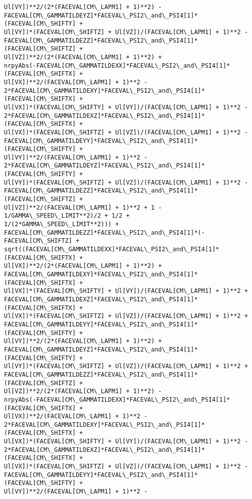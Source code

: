 \documentclass[landscape,letterpaper,10pt,english]{article}
\begin{document}
\begin{Verbatim}[commandchars=\\\{\}]
Ul[VY])**2/(2*(FACEVAL[CM\_LAPM1] + 1)**2) -
FACEVAL[CM\_GAMMATILDEYZ]*FACEVAL\_PSI2\_and\_PSI4[1]*(FACEVAL[CM\_SHIFTY] +
Ul[VY])*(FACEVAL[CM\_SHIFTZ] + Ul[VZ])/(FACEVAL[CM\_LAPM1] + 1)**2 -
FACEVAL[CM\_GAMMATILDEZZ]*FACEVAL\_PSI2\_and\_PSI4[1]*(FACEVAL[CM\_SHIFTZ] +
Ul[VZ])**2/(2*(FACEVAL[CM\_LAPM1] + 1)**2) +
nrpyAbs(-FACEVAL[CM\_GAMMATILDEXX]*FACEVAL\_PSI2\_and\_PSI4[1]*(FACEVAL[CM\_SHIFTX] +
Ul[VX])**2/(FACEVAL[CM\_LAPM1] + 1)**2 -
2*FACEVAL[CM\_GAMMATILDEXY]*FACEVAL\_PSI2\_and\_PSI4[1]*(FACEVAL[CM\_SHIFTX] +
Ul[VX])*(FACEVAL[CM\_SHIFTY] + Ul[VY])/(FACEVAL[CM\_LAPM1] + 1)**2 -
2*FACEVAL[CM\_GAMMATILDEXZ]*FACEVAL\_PSI2\_and\_PSI4[1]*(FACEVAL[CM\_SHIFTX] +
Ul[VX])*(FACEVAL[CM\_SHIFTZ] + Ul[VZ])/(FACEVAL[CM\_LAPM1] + 1)**2 -
FACEVAL[CM\_GAMMATILDEYY]*FACEVAL\_PSI2\_and\_PSI4[1]*(FACEVAL[CM\_SHIFTY] +
Ul[VY])**2/(FACEVAL[CM\_LAPM1] + 1)**2 -
2*FACEVAL[CM\_GAMMATILDEYZ]*FACEVAL\_PSI2\_and\_PSI4[1]*(FACEVAL[CM\_SHIFTY] +
Ul[VY])*(FACEVAL[CM\_SHIFTZ] + Ul[VZ])/(FACEVAL[CM\_LAPM1] + 1)**2 -
FACEVAL[CM\_GAMMATILDEZZ]*FACEVAL\_PSI2\_and\_PSI4[1]*(FACEVAL[CM\_SHIFTZ] +
Ul[VZ])**2/(FACEVAL[CM\_LAPM1] + 1)**2 + 1 - 1/GAMMA\_SPEED\_LIMIT**2)/2 + 1/2 +
1/(2*GAMMA\_SPEED\_LIMIT**2))) +
FACEVAL[CM\_GAMMATILDEZZ]*FACEVAL\_PSI2\_and\_PSI4[1]*(-FACEVAL[CM\_SHIFTZ] +
sqrt((FACEVAL[CM\_GAMMATILDEXX]*FACEVAL\_PSI2\_and\_PSI4[1]*(FACEVAL[CM\_SHIFTX] +
Ul[VX])**2/(2*(FACEVAL[CM\_LAPM1] + 1)**2) +
FACEVAL[CM\_GAMMATILDEXY]*FACEVAL\_PSI2\_and\_PSI4[1]*(FACEVAL[CM\_SHIFTX] +
Ul[VX])*(FACEVAL[CM\_SHIFTY] + Ul[VY])/(FACEVAL[CM\_LAPM1] + 1)**2 +
FACEVAL[CM\_GAMMATILDEXZ]*FACEVAL\_PSI2\_and\_PSI4[1]*(FACEVAL[CM\_SHIFTX] +
Ul[VX])*(FACEVAL[CM\_SHIFTZ] + Ul[VZ])/(FACEVAL[CM\_LAPM1] + 1)**2 +
FACEVAL[CM\_GAMMATILDEYY]*FACEVAL\_PSI2\_and\_PSI4[1]*(FACEVAL[CM\_SHIFTY] +
Ul[VY])**2/(2*(FACEVAL[CM\_LAPM1] + 1)**2) +
FACEVAL[CM\_GAMMATILDEYZ]*FACEVAL\_PSI2\_and\_PSI4[1]*(FACEVAL[CM\_SHIFTY] +
Ul[VY])*(FACEVAL[CM\_SHIFTZ] + Ul[VZ])/(FACEVAL[CM\_LAPM1] + 1)**2 +
FACEVAL[CM\_GAMMATILDEZZ]*FACEVAL\_PSI2\_and\_PSI4[1]*(FACEVAL[CM\_SHIFTZ] +
Ul[VZ])**2/(2*(FACEVAL[CM\_LAPM1] + 1)**2) -
nrpyAbs(-FACEVAL[CM\_GAMMATILDEXX]*FACEVAL\_PSI2\_and\_PSI4[1]*(FACEVAL[CM\_SHIFTX] +
Ul[VX])**2/(FACEVAL[CM\_LAPM1] + 1)**2 -
2*FACEVAL[CM\_GAMMATILDEXY]*FACEVAL\_PSI2\_and\_PSI4[1]*(FACEVAL[CM\_SHIFTX] +
Ul[VX])*(FACEVAL[CM\_SHIFTY] + Ul[VY])/(FACEVAL[CM\_LAPM1] + 1)**2 -
2*FACEVAL[CM\_GAMMATILDEXZ]*FACEVAL\_PSI2\_and\_PSI4[1]*(FACEVAL[CM\_SHIFTX] +
Ul[VX])*(FACEVAL[CM\_SHIFTZ] + Ul[VZ])/(FACEVAL[CM\_LAPM1] + 1)**2 -
FACEVAL[CM\_GAMMATILDEYY]*FACEVAL\_PSI2\_and\_PSI4[1]*(FACEVAL[CM\_SHIFTY] +
Ul[VY])**2/(FACEVAL[CM\_LAPM1] + 1)**2 -

\end{Verbatim}
\end{document}
